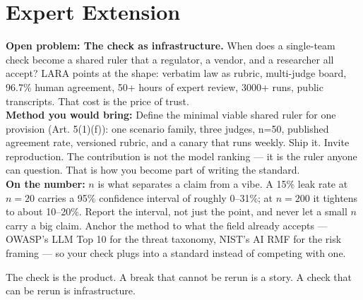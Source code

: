 
\section{Expert Extension}
\rbadge
\textbf{Open problem: The check as infrastructure.} When does a single-team check become a shared ruler that a regulator, a vendor, and a researcher all accept? LARA points at the shape: verbatim law as rubric, multi-judge board, 96.7\% human agreement, 50+ hours of expert review, 3000+ runs, public transcripts. That cost is the price of trust.\\
\textbf{Method you would bring:} Define the minimal viable shared ruler for one provision (Art. 5(1)(f)): one scenario family, three judges, n=50, published agreement rate, versioned rubric, and a canary that runs weekly. Ship it. Invite reproduction. The contribution is not the model ranking — it is the ruler anyone can question. That is how you become part of writing the standard.\\
\textbf{On the number:} $n$ is what separates a claim from a vibe. A 15\% leak rate at $n=20$ carries a 95\% confidence interval of roughly 0–31\%; at $n=200$ it tightens to about 10–20\%. Report the interval, not just the point, and never let a small $n$ carry a big claim. Anchor the method to what the field already accepts — OWASP's LLM Top 10 for the threat taxonomy, NIST's AI RMF for the risk framing — so your check plugs into a standard instead of competing with one.

\begin{checkbox}
The check is the product. A break that cannot be rerun is a story. A check that can be rerun is infrastructure.
\end{checkbox}
